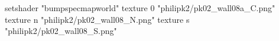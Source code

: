 setshader "bumpspecmapworld"
    texture 0 "philipk2/pk02_wall08a_C.png"
    texture n "philipk2/pk02_wall08_N.png"
    texture s "philipk2/pk02_wall08_S.png"